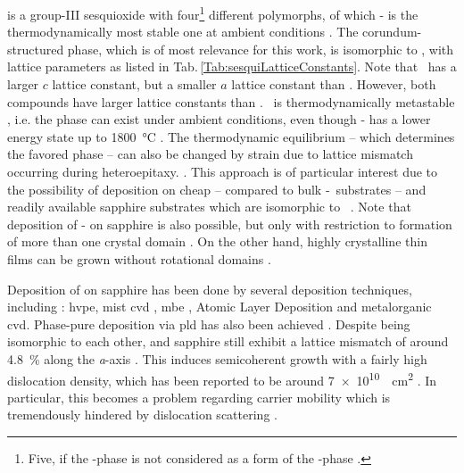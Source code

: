  is a group-III sesquioxide with four\footnote{
    Five, if the \textdelta-phase is not considered as a form of the \textkappa-phase \cite{hassa2021a}.
} different polymorphs, of which \textbeta- is the thermodynamically most stable one at ambient conditions
    \cite{schewski2015,hassa2021a,petersen2023}.
The corundum-structured \agao{} phase, which is of most relevance for this work, is isomorphic to , with lattice parameters as listed in Tab.\,\ref{Tab:sesquiLatticeConstants}.
Note that \cro\ has a larger $c$ lattice constant, but a smaller $a$ lattice constant than \agao.
However, both compounds have larger lattice constants than \alo.
\agao\ is thermodynamically metastable
    \cite{kaneko2023},
i.e. the phase can exist under ambient conditions, even though \textbeta- has a lower energy state up to \qty{1800}{\degreeCelsius}
    \cite{pearton2018}.
The thermodynamic equilibrium -- which determines the favored phase -- can also be changed by strain due to lattice mismatch occurring during heteroepitaxy.
        \cite{petersen2023}.
This approach is of particular interest due to the possibility of deposition on cheap -- compared to bulk \textbeta-\gao\ substrates \cite{yang2022,kaneko2023} -- and readily available sapphire substrates which are isomorphic to \agao\
    \cite{pearton2018,polyakov2022,kaneko2023}.
Note that deposition of \textbeta- on sapphire is also possible, but only with restriction to formation of more than one crystal domain
    \cite{yang2022}.
On the other hand, highly crystalline
    \cite{pearton2018}
\agao{} thin films can be grown without rotational domains
    \cite{yang2022,petersen2023}.

Deposition of \agao{} on sapphire has been done by several deposition techniques, including \cite{yang2022}:
    \gls{hvpe},
    mist \gls{cvd}
        \cite{kaneko2012},
    \gls{mbe}
        \cite{schewski2015},
    Atomic Layer Deposition and
    metalorganic \gls{cvd}.
Phase-pure deposition via \gls{pld} has also been achieved
    \cite{schewski2015,petersen2023,vogt2023}.
Despite being isomorphic to each other, \agao{} and sapphire still exhibit a lattice mismatch of around \qty{4.8}{\percent} along the \textit{a}-axis
    \cite{kaneko2023}.
This induces semicoherent growth with a fairly high dislocation density, which has been reported to be around \qty{7e10}{\per\square\cm}
    \cite{kaneko2012}.
In particular, this becomes a problem regarding carrier mobility which is tremendously hindered by dislocation scattering
    \cite{kaneko2023}.


